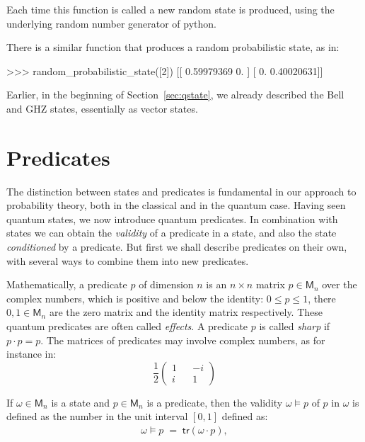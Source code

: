 \documentclass[leqno]{tufte-book} %
\newcommand{\Mat}{\mathsf{M}}
\newcommand{\tr}{\mathsf{tr}}
\begin{document}
\noindent Each time this function is called a new random state is
produced, using the underlying random number generator of python.

There is a similar function that produces a random probabilistic state,
as in:
\begin{python}
>>> random_probabilistic_state([2])
[[ 0.59979369  0.        ]
 [ 0.          0.40020631]]
\end{python}

\noindent Earlier, in the beginning of Section~\ref{sec:qstate}, we
already described the Bell and GHZ states, essentially as vector
states.



\section{Predicates}\label{sec:qpred}

The distinction between states and predicates is fundamental in our
approach to probability theory, both in the classical and in the
quantum case. Having seen quantum states, we now introduce quantum
predicates. In combination with states we can obtain the
\emph{validity} of a predicate in a state, and also the state
\emph{conditioned} by a predicate. But first we shall describe
predicates on their own, with several ways to combine them into new
predicates.

Mathematically, a predicate $p$ of dimension $n$ is an $n\times n$
matrix $p\in\Mat_n$ over the complex numbers, which is positive and
below the identity: $0 \leq p \leq 1$, there $0, 1 \in \Mat_{n}$ are
the zero matrix and the identity matrix respectively. These quantum
predicates are often called \emph{effects}. A predicate
$p$ is called
\emph{sharp}
if $p\cdot p = p$.  The matrices of predicates may involve complex
numbers, as for instance in:
$$\frac{1}{2}\left(\begin{array}{ccc}
1 & & -i
\\
i & & 1
\end{array}\right)$$

If $\omega\in\Mat_n$ is a state and $p\in\Mat_n$ is a predicate, then
the validity $\omega\models p$ of $p$ in $\omega$ is defined as the
number in the unit interval $[0,1]$ defined as:
\begin{equation}
\label{eqn:qvalidity}
\begin{array}{rcl}
\omega\models p
\;=\;
\tr(\omega\cdot p),
\end{array}
\end{equation}
\end{document}
